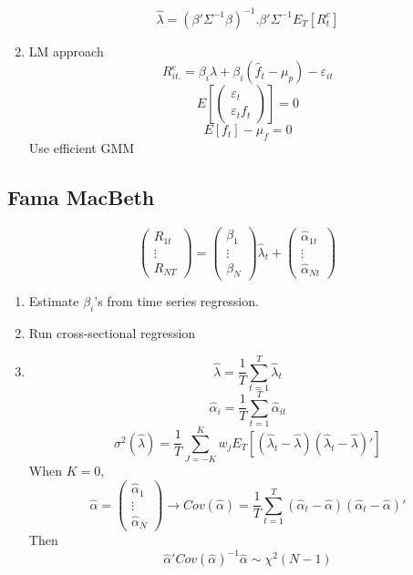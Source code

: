 \documentclass[11pt, a4paper, oneside]{article}
\theoremstyle{definition}
\theoremstyle{proposition}
\theoremstyle{corollary}
\theoremstyle{lemma}
\theoremstyle{theorem}
\begin{document}
\begin{enumerate}[(1)]
$$\hat{\lambda} = (\beta'\Sigma^{-1}\beta)^{-1}.\beta'\Sigma^{-1}E_T[R_t^e]$$
\item LM approach
$$R_{it.}^e = \beta_i \lambda + \beta_i (\hat{f}_t - \mu_p) - \varepsilon_{it}$$
$$E\left[\begin{pmatrix} 
\varepsilon_t \\
\varepsilon_tf_t
\end{pmatrix}\right] =0$$
$$E[f_t] - \mu_f = 0$$
Use efficient GMM
\end{enumerate}

\subsection{Fama MacBeth}
$$\begin{pmatrix} R_{1t} \\ \vdots \\ R_{NT}\end{pmatrix} = \begin{pmatrix} \beta_1 \\ \vdots \\ \beta_N\end{pmatrix} \hat{\lambda}_t + \begin{pmatrix} \hat{\alpha}_{1t} \\ \vdots \\ \hat{\alpha}_{Nt}\end{pmatrix}$$

\begin{enumerate}[(1)]
\item Estimate $\beta_i$'s from time series regression. 
\item Run cross-sectional regression
\item $$\hat{\lambda} = \frac{1}{T} \sum_{t=1}^T \hat{\lambda}_t$$
$$\hat{\alpha}_i = \frac{1}{T} \sum_{t=1}^T \hat{\alpha}_{it}$$
$$\sigma^2(\hat{\lambda}) = \frac{1}{T}\sum_{J=-K}^K w_j E_T[(\hat{\lambda}_t - \hat{\lambda})(\hat{\lambda}_t - \hat{\lambda})']$$
When $K = 0$, 
$$\hat{\alpha} = \begin{pmatrix} \hat{\alpha}_1 \\ \vdots \\ \hat{\alpha}_N\end{pmatrix} \to Cov(\hat{\alpha}) = \frac{1}{T} \sum_{t=1}^T(\hat{\alpha}_t - \hat{\alpha})(\hat{\alpha}_t - \hat{\alpha})'$$ 
Then
$$\hat{\alpha}'Cov(\hat{\alpha})^{-1}\hat{\alpha} \sim \chi^2(N-1)$$
\end{enumerate}
\end{document}
